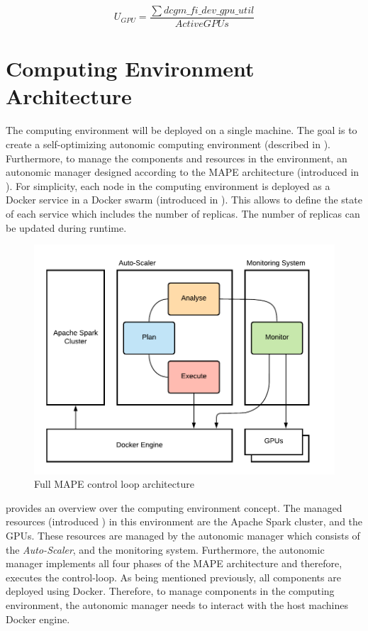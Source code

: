 \begin{equation}
U_{GPU} = \dfrac{\sum dcgm\_fi\_dev\_gpu\_util}{ActiveGPUs}
\label{eq:05_metrics_gpu}
\end{equation}


\section{Computing Environment Architecture}
The computing environment will be deployed on a single machine.
The goal is to create a self-optimizing autonomic computing environment (described in ).
Furthermore, to manage the components and resources in the environment, an autonomic manager designed according to the MAPE architecture (introduced in ).
For simplicity, each node in the computing environment is deployed as a Docker service in a Docker swarm (introduced in ).
This allows to define the state of each service which includes the number of replicas. The number of replicas can be updated during runtime.


\begin{figure}[h]
\centering
\includegraphics[scale=1]{images/05_conceptual_design/autonomic_manager/control_loop}
\caption{Full MAPE control loop architecture}
\label{fig:05_am_monitoring_loop_arch}
\end{figure}
 provides an overview over the computing environment concept.
The managed resources (introduced ) in this environment are the Apache Spark cluster, and the GPUs.
These resources are managed by the autonomic manager which consists of the \textit{Auto-Scaler}, and the monitoring system. Furthermore, the autonomic manager implements all four phases of the MAPE architecture and therefore, executes the control-loop.
As being mentioned previously, all components are deployed using Docker. Therefore, to manage components in the computing environment, the autonomic manager needs to interact with the host machines Docker engine.


